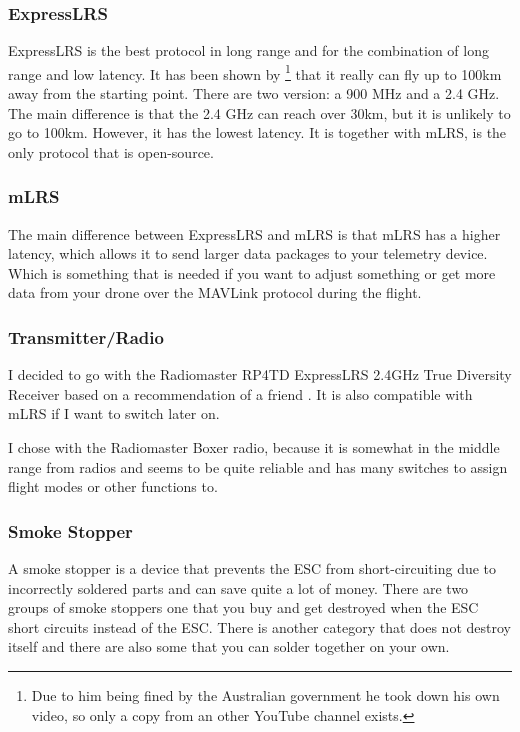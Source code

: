\documentclass[svgnames]{article}
\begin{document}
	\subsubsection*{ExpressLRS}
	ExpressLRS is the best protocol in long range and for the combination of long range and low latency. It has been shown by \textcite{elrswezley}\footnote{Due to him being fined by the Australian government he took down his own video, so only a copy from an other YouTube channel exists.} that it really can fly up to 100km away from the starting point. There are two version: a 900 MHz and a 2.4 GHz. The main difference is that the 2.4 GHz can reach over 30km, but it is unlikely to go to 100km. However, it has the lowest latency. It is together with mLRS, is the only protocol that is open-source.
	\subsubsection*{mLRS}
	The main difference between ExpressLRS and mLRS is that mLRS has a higher latency, which allows it to send larger data packages to your telemetry device. Which is something that is needed if you want to adjust something or get more data from your drone over the MAVLink protocol during the flight. 
	
	\subsubsection*{Transmitter/Radio}
	I decided to go with the Radiomaster RP4TD ExpressLRS 2.4GHz True Diversity Receiver based on a recommendation of a friend \cite{radiomasterreceiver}. It is also compatible with mLRS if I want to switch later on.
	
	I chose with the Radiomaster Boxer\cite{radiomasterboxer} radio, because it is somewhat in the middle range from radios and seems to be quite reliable and has many switches to assign flight modes or other functions to. 

	\subsubsection{Smoke Stopper}
	A smoke stopper is a device that prevents the ESC from short-circuiting due to incorrectly soldered parts and can save quite a lot of money. There are two groups of smoke stoppers one that you buy and get destroyed when the ESC short circuits instead of the ESC. There is another category that does not destroy itself and there are also some that you can solder together on your own\cite{smokestopper}. 
	
\end{document}
